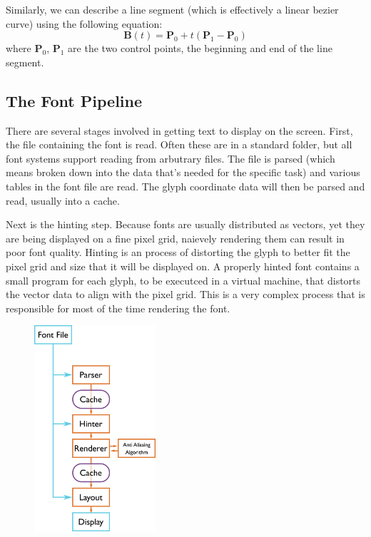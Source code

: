\documentclass{report}
\begin{document}
Similarly, we can describe a line segment (which is effectively a linear bezier
curve) using the following equation:
\begin{equation*}
  \mathbf{B}(t) = \mathbf{P}_0 + t(\mathbf{P}_1 - \mathbf{P}_0)
\end{equation*}
where $\mathbf{P}_0$, $\mathbf{P}_1$ are the two control points, the beginning
and end of the line segment. 

\subsection{The Font Pipeline}

There are several stages involved in getting text to display on the screen.
First, the file containing the font is read. Often these are in a standard
folder, but all font systems support reading from arbutrary files. The file is
parsed (which means broken down into the data that's needed for the specific
task) and various tables in the font file are read. The glyph coordinate data
will then be parsed and read, usually into a cache.

Next is the hinting step. Because fonts are usually distributed as vectors, yet
they are being displayed on a fine pixel grid, naievely rendering them can
result in poor font quality. Hinting is an process of distorting the glyph to
better fit the pixel grid and size that it will be displayed on. A properly
hinted font contains a small program for each glyph, to be executced in a
virtual machine, that distorts the vector data to align with the pixel grid.
This is a very complex process that is responsible for most of the time
rendering the font.
\begin{figure}
  \centering
  \includegraphics[width=0.4\textwidth]{fontpipelineimg}
\end{figure}
\end{document}
